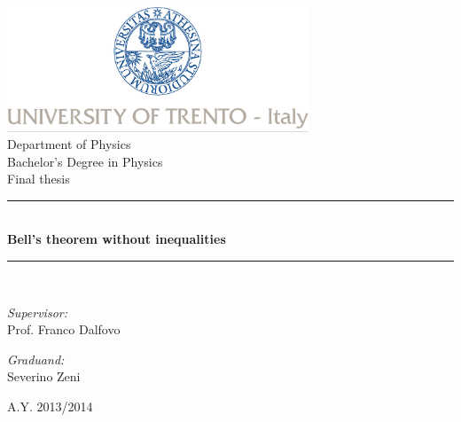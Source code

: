 \begin{titlepage}

\begin{center}

\includegraphics[width=9cm]{Frontmatter/Cover/logo-unitn.jpg}\\[0.4cm]

{\LARGE Department of Physics}\\[4.5cm]

{\Large Bachelor's Degree in Physics}\\[0.5cm]

{\Large Final thesis}\\[0.5cm]

\rule{\linewidth}{0.2mm} \\[0.5cm]

{ \huge \bfseries Bell's theorem without inequalities \\[0.5cm] }

\rule{\linewidth}{0.2mm} \\[2cm]

\begin{minipage}{0.4\textwidth}
\begin{flushleft} \large
\emph{Supervisor:} \\[0.25cm]
Prof. Franco Dalfovo
\end{flushleft}
\end{minipage}
\begin{minipage}{0.4\textwidth}
\begin{flushright} \large
\emph{Graduand:}\\[0.25cm]
Severino Zeni
\end{flushright}

\end{minipage}

\vfill

{\large A.Y. 2013/2014}

\end{center}

\restoregeometry
\end{titlepage}
